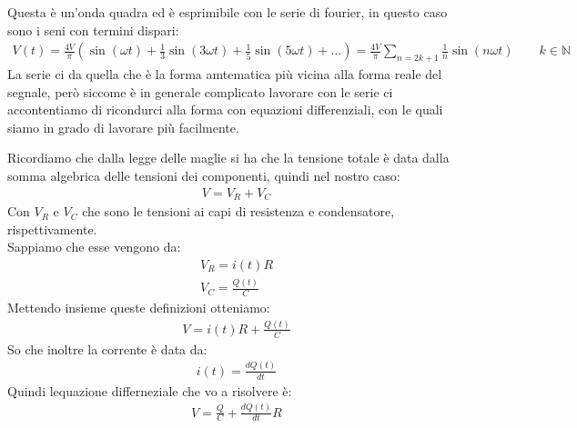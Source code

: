 \documentclass[a4paper, oneside]{article}
\begin{document}
\begin{center}
\end{center}
Questa è un'onda quadra ed è esprimibile con le serie di fourier, in questo caso sono i seni con termini dispari:
\begin{gather*}
    V(t) = \frac{4V}{\pi} \left( \sin(\omega t) + \frac{1}{3} \sin(3 \omega t) + \frac{1}{5} \sin(5\omega t) + \dots \right) = \frac{4V}{\pi} \sum_{n=2k + 1} \frac{1}{n} \sin(n \omega t) \qquad k \in \mathbb{N}
\end{gather*}
La serie ci da quella che è la forma amtematica più vicina alla forma reale del segnale, però siccome è in generale complicato lavorare con le serie ci accontentiamo di ricondurci alla forma con equazioni differenziali, 
con le quali siamo in grado di lavorare più facilmente.\\
\begin{center}
\end{center}
Ricordiamo che dalla legge delle maglie si ha che la tensione totale è data dalla somma algebrica delle tensioni dei componenti, quindi nel nostro caso:
\begin{gather*}
    V = V_R + V_C
\end{gather*}
Con $V_R$ e $V_C$ che sono le tensioni ai capi di resistenza e condensatore, rispettivamente.\\
Sappiamo che esse vengono da:
\begin{gather*}
    V_R = i(t) R\\
    V_C = \frac{Q(t)}{C}
\end{gather*}
Mettendo insieme queste definizioni otteniamo:
\begin{gather*}
    V = i(t) R + \frac{Q(t)}{C}
\end{gather*}
So che inoltre la corrente è data da:
\begin{gather*}
    i(t) = \frac{d Q(t)}{dt}
\end{gather*}
Quindi lequazione differneziale che vo a risolvere è:
\begin{gather*}
    V = \frac{Q}{C} + \frac{dQ(t)}{dt} R
\end{gather*}
\end{document}
